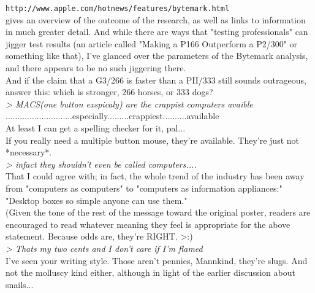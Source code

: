 \documentclass[11pt,twoside,a4paper]{article}
\begin{document}
\begin{multicols*}{2}
\texttt{http://www.apple.com/hotnews/features/bytemark.html}~\\

gives an overview of the outcome of the research, as well as links to information in much greater detail. And while there are ways that "testing professionals" can jigger test results (an article called "Making a P166 Outperform a P2/300" or something like that), I've glanced over the parameters of the Bytemark analysis, and there appears to be no such jiggering there.~\\

And if the claim that a G3/266 is faster than a PII/333 still sounds outrageous, answer this: which is stronger, 266 horses, or 333 dogs?~\\

\emph{> MACS(one button exspicaly) are the crappist computers avaible}~\\

............................especially.........crappiest..........available~\\

At least I can get a spelling checker for it, pal...~\\

If you really need a multiple button mouse, they're available. They're just not *necessary*.~\\

\emph{> infact they shouldn't even be called computers....}~\\

That I could agree with; in fact, the whole trend of the industry has been away from "computers as computers" to "computers as information appliances:"~\\

"Desktop boxes so simple anyone can use them."~\\

(Given the tone of the rest of the message toward the original poster, readers are encouraged to read whatever meaning they feel is appropriate for the above statement. Because odds are, they're RIGHT. >:)~\\

\emph{> Thats my two cents and I don't care if I'm flamed}~\\

I've seen your writing style. Those aren't pennies, Mannkind, they're slugs. And not the molluscy kind either, although in light of the earlier discussion about snails...~\\


\end{multicols*}
\end{document}
